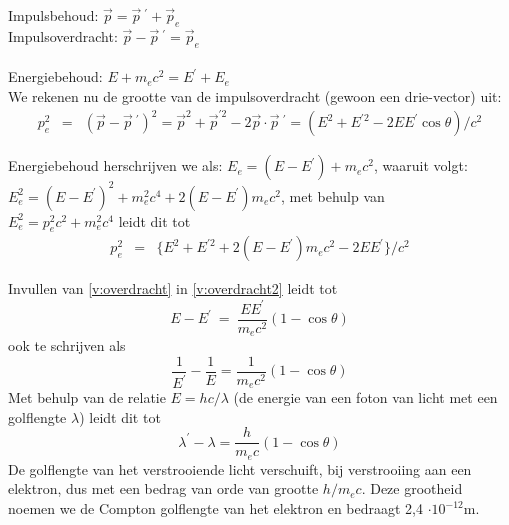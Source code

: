 \noindent
Impulsbehoud: $\vec{p}=\vec{p}\ ^\prime + \vec{p}_e$\\
Impulsoverdracht: $\vec{p} - \vec{p}\ ^\prime = \vec{p}_e$\\
\\
Energiebehoud: $E+m_ec^2=E^\prime + E_e$\\

We rekenen nu de grootte van de impulsoverdracht (gewoon een drie-vector) uit:
\begin{eqnarray}
\label{v:overdracht}
p_e^{2} & = & (\vec{p}-\vec{p}\ ^{\prime})^{2}=\vec{p}^{2}+\vec{p}^{\prime 2}-2\vec{p}\cdot\vec{p}\ ^{\prime}=(E^{2}+E^{\prime 2}-2EE^{\prime}\cos\theta)/c^{2}
\end{eqnarray}

Energiebehoud herschrijven we als: $E_e=(E-E^\prime)+m_ec^2$, waaruit volgt:\\
$E_e^2=(E-E^\prime)^2+m_e^2c^4+2(E-E^\prime)m_ec^2$, met behulp van\\
$E_e^2=p_e^2c^2+m_e^2c^4$ leidt dit tot\\
\begin{eqnarray}
\label{v:overdracht2}
p_e^{2} & = & \{E^{2}+E^{\prime 2}+2(E-E^{\prime})m_{e}c^{2}-2EE^{\prime}\}/c^{2}
\end{eqnarray} 

Invullen van \ref{v:overdracht} in \ref{v:overdracht2} leidt tot 
\begin{displaymath}
E-E^\prime~=~\frac{EE^\prime}{m_ec^2}(1-\cos\theta)
\end{displaymath}
ook te schrijven als
\begin{displaymath}
\frac{1}{E^\prime}-\frac{1}{E}=\frac{1}{m_ec^2}(1-\cos\theta)
\end{displaymath}
Met behulp van de relatie $E=hc/\lambda$ (de energie van een foton van licht 
met een golflengte $\lambda$) leidt dit tot
\begin{displaymath}
\lambda ^\prime - \lambda  = \frac{h}{m_ec}(1-\cos\theta)
\end{displaymath}
De golflengte van het verstrooiende licht verschuift, bij verstrooiing aan een elektron,
dus met een bedrag van orde van grootte $h/m_ec$. Deze grootheid noemen we de
Compton golflengte van het elektron en bedraagt 2,4 $\cdot 10^{-12}$m. 

